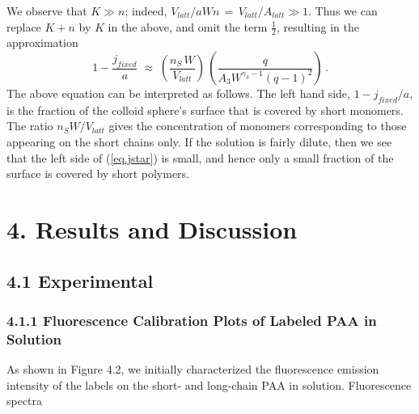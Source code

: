\documentclass[journal=mamobx,manuscript=article]{achemso}
\begin{document}
We observe that $K\gg n$; indeed,  $V_{latt}/aWn \,=\,V_{latt}/A_{latt}\gg 1$.  
Thus we can replace $K+n$ by $K$ in the above, and omit the term $\frac{1}{2}$, resulting in the   
approximation 
\begin{equation}
    \label{eq.jstar}
     1-\frac{j_{fixed}}{a}     \; \approx   \; 
        \left(  \frac{n_S\,W}{V_{latt} }\right) \,\left(   \frac{q}{A_3W^{\gamma_3-1}(q-1)^2}\right)  \,.
\end{equation}
The above equation can be interpreted as follows.  The left hand side, $1-j_{fixed}/a$, is the fraction of the colloid sphere's surface that is covered by short monomers.  The ratio $n_SW/V_{latt}$ gives
the concentration of monomers corresponding to those appearing on the short chains only.
If the solution is fairly dilute, then we see that the left side of (\ref{eq.jstar}) is small,
and hence only a small fraction of the surface is covered by short polymers.



\section{4. Results and Discussion}

\subsection{4.1 Experimental}

\subsubsection{4.1.1 Fluorescence Calibration Plots of Labeled PAA in Solution}

As shown in Figure 4.2, we initially characterized the fluorescence emission intensity of the labels on the short- and long-chain PAA in solution.  Fluorescence spectra
\end{document}
